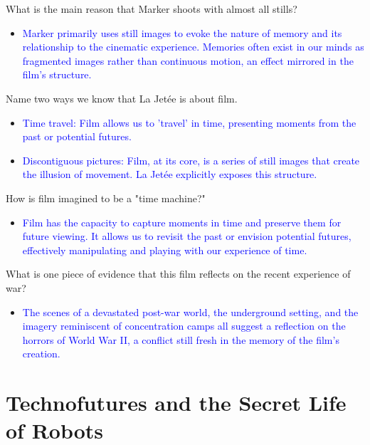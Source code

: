 \documentclass[11pt,fleqn]{book}
\begin{document}
\begin{exercise}
What is the main reason that Marker shoots with almost all stills?
\begin{itemize}
\item \textcolor{blue}{Marker primarily uses still images to evoke the nature of memory and its relationship to the cinematic experience. Memories often exist in our minds as fragmented images rather than continuous motion, an effect mirrored in the film's structure.}
\end{itemize}
\end{exercise}

\begin{exercise}
Name two ways we know that La Jetée is about film.
\begin{itemize}
\item \textcolor{blue}{Time travel: Film allows us to 'travel' in time, presenting moments from the past or potential futures.}
\item \textcolor{blue}{Discontiguous pictures: Film, at its core, is a series of still images that create the illusion of movement. La Jetée explicitly exposes this structure.}
\end{itemize}
\end{exercise}

\begin{exercise}
How is film imagined to be a "time machine?"
\begin{itemize}
\item \textcolor{blue}{ Film has the capacity to capture moments in time and preserve them for future viewing. It allows us to revisit the past or envision potential futures, effectively manipulating and playing with our experience of time.}
\end{itemize}
\end{exercise}

\begin{exercise}
What is one piece of evidence that this film reflects on the recent experience of war?
\begin{itemize}
\item \textcolor{blue}{The scenes of a devastated post-war world, the underground setting, and the imagery reminiscent of concentration camps all suggest a reflection on the horrors of World War II, a conflict still fresh in the memory of the film's creation.}
\end{itemize}
\end{exercise}


\section{Technofutures and the Secret Life of Robots}
\end{document}
